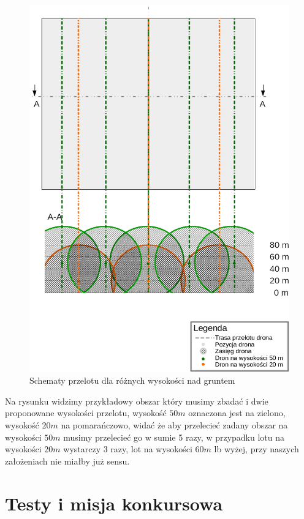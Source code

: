 \begin{figure}[!th]
    \centering
    \includegraphics[width=15cm]{zalaczniki/obrazy/schemat_przelotu.png}
    \caption{Schematy przelotu dla różnych wysokości nad gruntem}
    \label{fig:schematprzelotu}
\end{figure}

Na rysunku widzimy przykładowy obszar który musimy zbadać i dwie proponowane wysokości przelotu, wysokość $50 m$ oznaczona jest na zielono, wysokość $20 m$ na pomarańczowo, widać że aby przelecieć zadany obszar na wysokości $50 m$ musimy przelecieć go w sumie 5 razy, w przypadku lotu na wysokości $20 m$ wystarczy 3 razy, lot na wysokości $60 m$ lb wyżej, przy naszych założeniach nie miałby już sensu.

\section{Testy i misja konkursowa}


